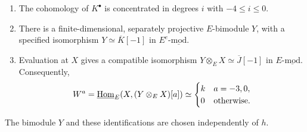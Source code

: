 \documentclass[11pt]{article}
\begin{document}
\begin{Prop}\label{ind:Y-evaluation}
\leavevmode
\begin{enumerate}
\item\label{ind:model-cohomology} The cohomology of $K^\bullet$ is concentrated in degrees $i$ with
$-4\leq i\leq 0$.

\item\label{ind:model-bimodule} There is a finite-dimensional, separately projective $E$-bimodule $Y$, with a specified isomorphism
$Y\simeq\overline K[-1]$ in
$E^e\text{-}\underline{\mathrm{mod}}$.

\item\label{ind:model-evaluation} Evaluation at $X$ gives a compatible isomorphism
$Y\otimes_E X\simeq\overline J[-1]$ in
$E\text{-}\underline{\mathrm{mod}}$. Consequently,
\begin{equation*}
 W^a=\underline{{\rm Hom}}_E(X,(Y\otimes_E X)[a])
  \simeq\begin{cases}k&a=-3,0,\\0&\text{otherwise}.
    \end{cases}
\end{equation*}
\end{enumerate}
The bimodule $Y$ and these identifications are chosen independently
of $h$.
\end{Prop}
\end{document}
